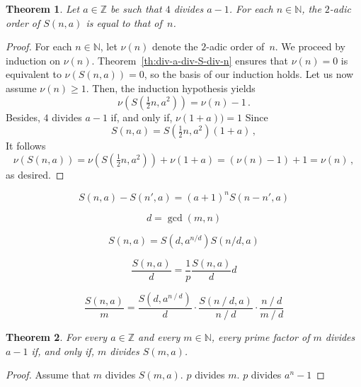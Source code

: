 \documentclass[12pt]{article}
\newcommand{\bZ}{\mathbb{Z}}
\newcommand{\bN}{\mathbb{N}} %
\newtheorem{theorem}{Theorem}
\theoremstyle{definition}
\begin{document}
 \begin{theorem}
   Let $a \in \bZ$  be such that $4$ divides $a - 1$.
   For each $n \in \bN$, the $2$-adic order of $S(n, a)$ is equal to that of~$n$.
 \end{theorem} 

 \begin{proof}
   For each $n \in \bN$, let $\nu(n)$ denote the $2$-adic order of~$n$.
   We proceed by induction on $\nu(n)$.
   Theorem~\ref{th:div-a-div-S-div-n} ensures that  $\nu(n) = 0$ is equivalent to  $\nu(S(n, a)) = 0$,
   so the basis of our induction holds.
   Let us now assume $\nu(n) \ge 1$.
   Then, the induction hypothesis yields
   $$
   \nu(S(\tfrac{1}{2} n, a^2)) = \nu(n) - 1  \, .
   $$
   Besides,  $4$ divides $a - 1$ if, and only if, $\nu(1 + a)) = 1$
   Since 
   $$
   S(n, a) = S(\tfrac{1}{2} n, a^2) (1 + a) \,, 
   $$
   It follows
   $$
   \nu(S(n, a))
   = \nu(S(\tfrac{1}{2} n, a^2)) + \nu(1 + a)
   = (\nu(n) - 1) + 1 = \nu(n) \,, 
   $$
   as desired.  
  
 \end{proof}


$$
S(n, a) - S(n', a) = {(a + 1)}^n S(n - n', a)
$$

$$
d = \gcd(m, n)
$$

$$
S(n, a) = S(d, a^{n/d}) S(n/d, a)
$$

 
$$
\frac{S(n, a)}{d}  = \frac{1}{p} \frac{S(n, a)}{d} d
$$


$$
\frac{S(n, a)}{m}  =
\frac{S(d, a^{n\mathbin{/}d})}{d}
\cdot 
\frac{S(n\mathbin{/}d, a)}{n\mathbin{/}d}
\cdot 
\frac{n \mathbin{/} d}{m \mathbin{/} d}
$$

\begin{theorem}
  For every $a \in \bZ$ and every  $m \in \bN$, 
  every prime factor of $m$ divides $a - 1$ if, and only if, $m$ divides $S(m, a)$.
\end{theorem}

\begin{proof}
  Assume that $m$ divides $S(m, a)$.
  $p$ divides $m$.
  $p$ divides $a^n - 1$
\end{proof}
\end{document}
